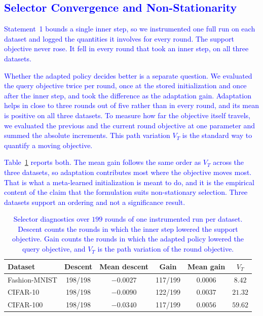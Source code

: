 \documentclass[journal]{IEEEtran}
\newcommand{\revision}[1]{\textcolor{blue}{#1}}
\begin{document}
\subsection{\revision{Selector Convergence and Non-Stationarity}}
\revision{Statement~1 bounds a single inner step, so we instrumented one full run on each dataset and logged the quantities it involves for every round. The support objective never rose. It fell in every round that took an inner step, on all three datasets.}

\revision{Whether the adapted policy decides better is a separate question. We evaluated the query objective twice per round, once at the stored initialization and once after the inner step, and took the difference as the adaptation gain. Adaptation helps in close to three rounds out of five rather than in every round, and its mean is positive on all three datasets. To measure how far the objective itself travels, we evaluated the previous and the current round objective at one parameter and summed the absolute increments. This path variation $V_T$ is the standard way to quantify a moving objective.}

\revision{Table~\ref{tab:drift} reports both. The mean gain follows the same order as $V_T$ across the three datasets, so adaptation contributes most where the objective moves most. That is what a meta-learned initialization is meant to do, and it is the empirical content of the claim that the formulation suits non-stationary selection. Three datasets support an ordering and not a significance result.}

\begin{table}[!t]
\centering
\caption{\revision{Selector diagnostics over $199$ rounds of one instrumented run per dataset. Descent counts the rounds in which the inner step lowered the support objective. Gain counts the rounds in which the adapted policy lowered the query objective, and $V_T$ is the path variation of the round objective.}}
\label{tab:drift}
\scriptsize
\setlength{\tabcolsep}{3pt}
\renewcommand{\arraystretch}{0.92}
\begin{tabular*}{\columnwidth}{@{\extracolsep{\fill}}lccccc@{}}
\toprule
Dataset & Descent & Mean descent & Gain & Mean gain & $V_T$ \\
\midrule
Fashion-MNIST & 198/198 & $-0.0027$ & 117/199 & $0.0006$ & $8.42$ \\
CIFAR-10      & 198/198 & $-0.0090$ & 122/199 & $0.0037$ & $21.32$ \\
CIFAR-100     & 198/198 & $-0.0340$ & 117/199 & $0.0056$ & $59.62$ \\
\bottomrule
\end{tabular*}
\end{table}
\end{document}
